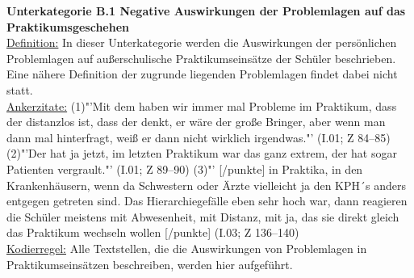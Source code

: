 \textbf{Unterkategorie B.1 Negative Auswirkungen der Problemlagen auf das Praktikumsgeschehen }\\
\underline{Definition:} In dieser Unterkategorie werden die Auswirkungen der persönlichen Problemlagen auf außerschulische Praktikumseinsätze der Schüler beschrieben. Eine nähere Definition der zugrunde liegenden Problemlagen findet dabei nicht statt. \\
\underline{Ankerzitate:} (1)"'Mit dem haben wir immer mal Probleme im Praktikum, dass der distanzlos ist, dass der denkt, er wäre der große Bringer, aber wenn man dann mal hinterfragt, weiß er dann nicht wirklich irgendwas."' (I.01; Z 84--85) (2)"'Der hat ja jetzt, im letzten Praktikum war das ganz extrem, der hat sogar Patienten vergrault."' (I.01; Z 89--90) (3)"' [/punkte] in Praktika, in den Krankenhäusern, wenn da Schwestern oder Ärzte vielleicht ja den KPH´s anders entgegen getreten sind. Das Hierarchiegefälle eben sehr hoch war, dann reagieren die Schüler meistens mit Abwesenheit, mit Distanz, mit ja, das sie direkt gleich das Praktikum wechseln wollen [/punkte] (I.03; Z 136--140)\\
\underline{Kodierregel:} Alle Textstellen, die die Auswirkungen von Problemlagen in Praktikumseinsätzen beschreiben, werden hier aufgeführt.\\

